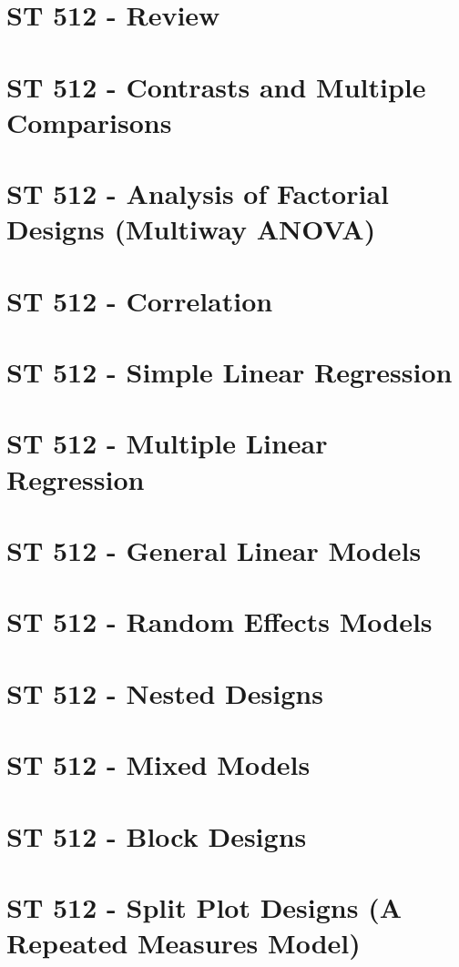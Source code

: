 \documentclass{report}
\begin{document}
\setlength{\topmargin}{0pt}
\setlength{\oddsidemargin}{0pt}
\tableofcontents
	
\newpage
{}
\chapter{ST 512 - Review}

\chapter{ST 512 - Contrasts and Multiple Comparisons}

\chapter{ST 512 - Analysis of Factorial Designs (Multiway ANOVA)}

\chapter{ST 512 - Correlation}

\chapter{ST 512 - Simple Linear Regression}

\chapter{ST 512 - Multiple Linear Regression}

\chapter{ST 512 - General Linear Models}

\chapter{ST 512 - Random Effects Models}

\chapter{ST 512 - Nested Designs}

\chapter{ST 512 - Mixed Models}

\chapter{ST 512 - Block Designs}

\chapter{ST 512 - Split Plot Designs (A Repeated Measures Model)}

\end{document}
